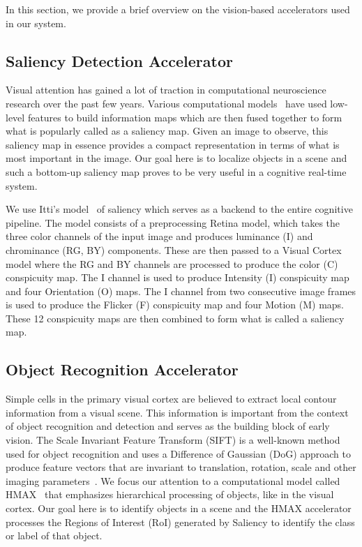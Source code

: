 In this section, we provide a brief overview on the vision-based accelerators used in our system. 

\subsection{Saliency Detection Accelerator}
Visual attention has gained a lot of traction in computational neuroscience research over the past few years. Various computational models~\cite{Itti1998,Itti2001,Bruce2009a} have used low-level features to build information maps which are then fused together to form what is popularly called as a saliency map. Given an image to observe, this saliency map in essence provides a compact representation in terms of what is most important in the image. 
Our goal here is to localize objects in a scene and such a bottom-up saliency map proves to be very useful in a cognitive real-time system.

We use Itti's model~\cite{Peters2007} of saliency which serves as a backend to the entire cognitive pipeline. The model consists of a preprocessing Retina model, which takes the three color channels of the input image and produces luminance (I) and chrominance (RG, BY) components. These are then passed to a Visual Cortex model where the RG and BY channels are processed to produce the color (C) conspicuity map. The I channel is used to produce Intensity (I) conspicuity map and four Orientation (O) maps. The I channel from two consecutive image frames is used to produce the Flicker (F) conspicuity map and four Motion (M) maps. These 12 conspicuity maps are then combined to form what is called a saliency map.

\subsection{Object Recognition Accelerator}

Simple cells in the primary visual cortex are believed to extract local contour information from a visual scene. This information is important from the context of object recognition and detection and serves as the building block of early vision. The Scale Invariant Feature Transform (SIFT) is a well-known method used for object recognition and uses a Difference of Gaussian (DoG) approach to produce feature vectors that are invariant to translation, rotation, scale and other imaging parameters~\cite{Lowe2004}. We focus our attention to a computational model called HMAX~\cite{Mutch2008} that emphasizes hierarchical processing of objects, like in the visual cortex. Our goal here is to identify objects in a scene and the HMAX accelerator processes the Regions of Interest (RoI) generated by Saliency to identify the class or label of that object. 

